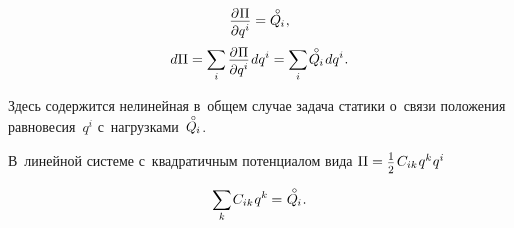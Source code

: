 \begin{otherlanguage}{russian}
\nopagebreak\vspace{-0.1em}\begin{equation}\label{staticequilibriumwithpotentialenergy}
\scalebox{0.96}{$ \displaystyle \frac{\raisemath{-0.15em}{\partial \hspace{.1ex} \potentialenergydensity}}{\raisemath{-0.1em}{\partial q^i}} $} = \mathcircabove{Q}_{\hspace{-0.1ex}i}
\hspace{.1ex},
\end{equation}
\nopagebreak\vspace{.1em}\begin{equation*}
d\potentialenergydensity = \scalebox{0.95}[1]{$\displaystyle \sum_{\smash{i}}$} \hspace{.32ex}
\scalebox{0.96}{$ \displaystyle \frac{\raisemath{-0.15em}{\partial \hspace{.1ex} \potentialenergydensity}}{\raisemath{-0.1em}{\partial q^i}} $} \hspace{.2ex} dq^i
= \scalebox{0.95}[1]{$\displaystyle \sum_{\smash{i}}$} \hspace{.2ex} \mathcircabove{Q}_{\hspace{-0.1ex}i} \hspace{.2ex} dq^i
\hspace{.1ex} .
\end{equation*}

\vspace{-0.5em}\noindent
Здесь содержится нелинейная в~общем случае задача статики о~связи положения равновесия~$q^i$ с~нагрузками~${\mathcircabove{Q}_{\hspace{-0.1ex}i}}$.

В~линейной системе с~квадратичным потенциалом вида ${\potentialenergydensity = \smalldisplaystyleonehalf \hspace{.2ex} C_{ik} \hspace{.15ex} q^{k} \hspace{.1ex} q^{i}}$

\nopagebreak\vspace{-1.25em}\begin{equation}\label{staticsoflineardiscretesystem}
\scalebox{0.95}[1]{$\displaystyle \sum_{\smash{k}}$} \hspace{.2ex} C_{ik} \hspace{.12ex} q^k \hspace{-0.1ex}
= \hspace{.1ex} \mathcircabove{Q}_{\hspace{-0.1ex}i} \hspace{.1ex} .
\vspace{-0.1em}\end{equation}


\end{otherlanguage}
